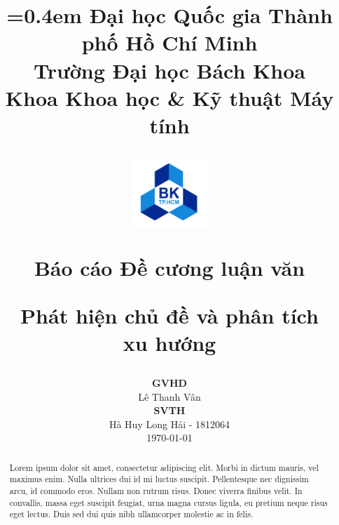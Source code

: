 \documentclass[11pt, a4paper]{article}
\renewcommand{\baselinestretch}{1.3}
\begin{document}
\title{
	{\parskip=0.4em\normalsize
			Đại học Quốc gia Thành phố Hồ Chí Minh\\
			Trường Đại học Bách Khoa\\
			Khoa Khoa học \& Kỹ thuật Máy tính\\
		}
	\vspace{0.5cm}
	\begin{figure}[!ht]
		\centering
		\includegraphics[width=0.26\textwidth]{img/logo/LogoBKChinhThuc.png}
	\end{figure}
	\vspace{0.1cm}
	\Large {Báo cáo Đề cương luận văn} \\
	\vspace{0.3cm}

	\Huge {\renewcommand{\baselinestretch}{0.1} Phát hiện chủ đề và phân tích\\[-0.2em]xu hướng}

	\vspace{0.3cm}
}
\author{}



\date{
	\textbf{\large GVHD}\\[0.3em]
	Lê Thanh Vân\\[2em]
	\textbf{\large SVTH}\\[0.3em]
	Hà Huy Long Hải - 1812064\\
	\vspace{4cm}
	\normalsize{\today}
}

\maketitle
\thispagestyle{empty}

\vspace{2cm}

\begin{abstract}
	Lorem ipsum dolor sit amet, consectetur adipiscing elit. Morbi in dictum mauris, vel maximus enim. Nulla ultrices dui id mi luctus suscipit. Pellentesque nec dignissim arcu, id commodo eros. Nullam non rutrum risus. Donec viverra finibus velit. In convallis, massa eget suscipit feugiat, urna magna cursus ligula, eu pretium neque risus eget lectus. Duis sed dui quis nibh ullamcorper molestie ac in felis.
\end{abstract}
\end{document}
